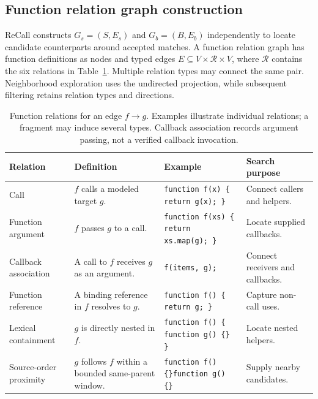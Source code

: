 \subsection{Function relation graph construction}
\label{sec:graph-construction}
ReCall constructs $G_s=(S,E_s)$ and $G_b=(B,E_b)$ independently to locate candidate counterparts around accepted matches. A function relation graph has function definitions as nodes and typed edges $E\subseteq V\times\mathcal{R}\times V$, where $\mathcal{R}$ contains the six relations in Table~\ref{tab:function-relations}. Multiple relation types may connect the same pair. Neighborhood exploration uses the undirected projection, while subsequent filtering retains relation types and directions.

\begin{table}[htbp]
\caption{Function relations for an edge $f\rightarrow g$. Examples illustrate individual relations; a fragment may induce several types. Callback association records argument passing, not a verified callback invocation.}
\label{tab:function-relations}
\centering\scriptsize
\setlength{\tabcolsep}{3pt}
\begin{tabular}{@{}p{.15\linewidth}p{.24\linewidth}p{.35\linewidth}p{.19\linewidth}@{}}
\toprule
Relation & Definition & Example & Search purpose\\
\midrule
Call & $f$ calls a modeled target $g$. & \texttt{function f(x) \{ return g(x); \}} & Connect callers and helpers.\\
\addlinespace
Function argument & $f$ passes $g$ to a call. & \texttt{function f(xs) \{ return xs.map(g); \}} & Locate supplied callbacks.\\
\addlinespace
Callback association & A call to $f$ receives $g$ as an argument. & \texttt{f(items, g);} & Connect receivers and callbacks.\\
\addlinespace
Function reference & A binding reference in $f$ resolves to $g$. & \texttt{function f() \{ return g; \}} & Capture non-call uses.\\
\addlinespace
Lexical containment & $g$ is directly nested in $f$. & \texttt{function f() \{ function g() \{\} \}} & Locate nested helpers.\\
\addlinespace
Source-order proximity & $g$ follows $f$ within a bounded same-parent window. & \texttt{function f() \{\}}\newline\texttt{function g() \{\}} & Supply nearby candidates.\\
\bottomrule
\end{tabular}
\end{table}

